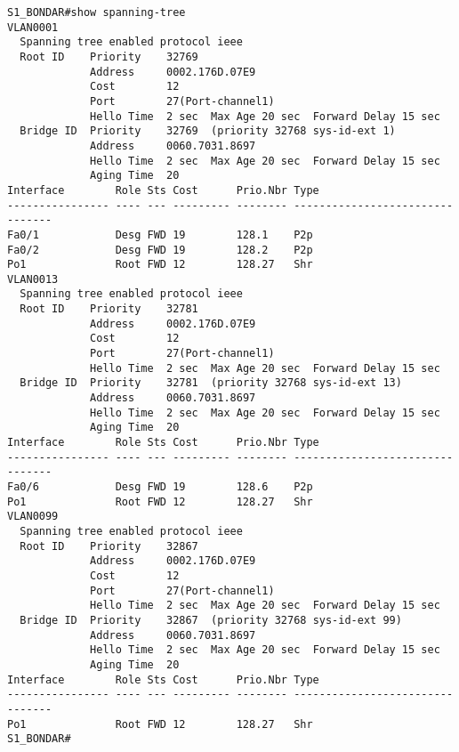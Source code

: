 \begin{verbatim}
S1_BONDAR#show spanning-tree 
VLAN0001
  Spanning tree enabled protocol ieee
  Root ID    Priority    32769
             Address     0002.176D.07E9
             Cost        12
             Port        27(Port-channel1)
             Hello Time  2 sec  Max Age 20 sec  Forward Delay 15 sec
  Bridge ID  Priority    32769  (priority 32768 sys-id-ext 1)
             Address     0060.7031.8697
             Hello Time  2 sec  Max Age 20 sec  Forward Delay 15 sec
             Aging Time  20
Interface        Role Sts Cost      Prio.Nbr Type
---------------- ---- --- --------- -------- --------------------------------
Fa0/1            Desg FWD 19        128.1    P2p
Fa0/2            Desg FWD 19        128.2    P2p
Po1              Root FWD 12        128.27   Shr
VLAN0013
  Spanning tree enabled protocol ieee
  Root ID    Priority    32781
             Address     0002.176D.07E9
             Cost        12
             Port        27(Port-channel1)
             Hello Time  2 sec  Max Age 20 sec  Forward Delay 15 sec
  Bridge ID  Priority    32781  (priority 32768 sys-id-ext 13)
             Address     0060.7031.8697
             Hello Time  2 sec  Max Age 20 sec  Forward Delay 15 sec
             Aging Time  20
Interface        Role Sts Cost      Prio.Nbr Type
---------------- ---- --- --------- -------- --------------------------------
Fa0/6            Desg FWD 19        128.6    P2p
Po1              Root FWD 12        128.27   Shr
VLAN0099
  Spanning tree enabled protocol ieee
  Root ID    Priority    32867
             Address     0002.176D.07E9
             Cost        12
             Port        27(Port-channel1)
             Hello Time  2 sec  Max Age 20 sec  Forward Delay 15 sec
  Bridge ID  Priority    32867  (priority 32768 sys-id-ext 99)
             Address     0060.7031.8697
             Hello Time  2 sec  Max Age 20 sec  Forward Delay 15 sec
             Aging Time  20
Interface        Role Sts Cost      Prio.Nbr Type
---------------- ---- --- --------- -------- --------------------------------
Po1              Root FWD 12        128.27   Shr
S1_BONDAR#
\end{verbatim}

